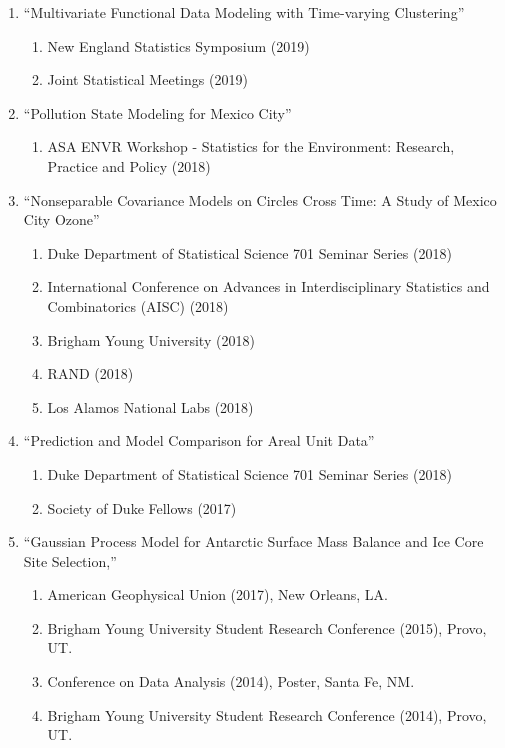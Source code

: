 \documentclass[11pt]{article}
\begin{document}
\begin{enumerate}[label=$\cdot$]
\item ``Multivariate Functional Data Modeling with Time-varying Clustering''
\begin{enumerate}[label=$-$]
\item New England Statistics Symposium (2019)
\item Joint Statistical Meetings (2019)
\end{enumerate}
\item ``Pollution State Modeling for Mexico City''
\begin{enumerate}[label=$-$]
\item ASA ENVR Workshop - Statistics for the Environment: Research, Practice and Policy (2018)
\end{enumerate}
\item ``Nonseparable Covariance Models on Circles Cross Time: A Study of Mexico City Ozone''
\begin{enumerate}[label=$-$]
\item Duke Department of Statistical Science 701 Seminar Series (2018)
\item International Conference on Advances in Interdisciplinary Statistics and Combinatorics (AISC) (2018)
\item Brigham Young University (2018)
\item RAND (2018)
\item Los Alamos National Labs (2018)
\end{enumerate}
\item ``Prediction and Model Comparison for Areal Unit Data''
\begin{enumerate}[label=$-$]
\item Duke Department of Statistical Science 701 Seminar Series (2018)
\item Society of Duke Fellows (2017)
\end{enumerate}
\item  ``Gaussian Process Model for Antarctic Surface Mass Balance and Ice Core Site Selection,'' 
\begin{enumerate}[label=$-$]
\item American Geophysical Union (2017), New Orleans, LA.
\item Brigham Young University Student Research Conference (2015),  Provo, UT.
\item Conference on Data Analysis (2014), Poster, Santa Fe, NM.
\item Brigham Young University Student Research Conference (2014), Provo, UT.

\end{enumerate}
\end{enumerate}
\end{document}
